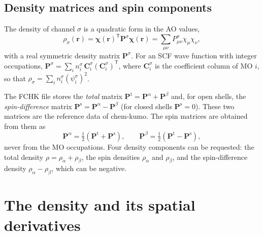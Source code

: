 \documentclass[11pt,a4paper]{article}
\begin{document}
\subsection{Density matrices and spin components}
The density of channel $\sigma$ is a quadratic form in the AO values,
\begin{equation}
 \rho_\sigma(\mathbf r)=\boldsymbol\chi(\mathbf r)^{\mathsf T}\mathbf P^\sigma
 \boldsymbol\chi(\mathbf r)=\sum_{\mu\nu}P^\sigma_{\mu\nu}\chi_\mu\chi_\nu,
\end{equation}
with a real symmetric density matrix $\mathbf P^\sigma$. For an SCF wave
function with integer occupations,
$\mathbf P^\sigma=\sum_i n_i^\sigma\,\mathbf C^\sigma_i(\mathbf C^\sigma_i)^{\mathsf T}$,
where $\mathbf C^\sigma_i$ is the coefficient column of MO $i$, so that
$\rho_\sigma=\sum_in_i^\sigma(\psi_i^\sigma)^2$.

The FCHK file stores the \emph{total} matrix
$\mathbf P^{\mathrm t}=\mathbf P^\alpha+\mathbf P^\beta$ and, for open
shells, the \emph{spin-difference} matrix
$\mathbf P^{\mathrm s}=\mathbf P^\alpha-\mathbf P^\beta$ (for closed shells
$\mathbf P^{\mathrm s}=0$). These two matrices are the reference data of
chem-kumo. The spin matrices are obtained from them as
\begin{equation}
 \mathbf P^\alpha=\tfrac12(\mathbf P^{\mathrm t}+\mathbf P^{\mathrm s}),\qquad
 \mathbf P^\beta=\tfrac12(\mathbf P^{\mathrm t}-\mathbf P^{\mathrm s}),
\end{equation}
never from the MO occupations. Four density components can be requested:
the total density $\rho=\rho_\alpha+\rho_\beta$, the spin densities
$\rho_\alpha$ and $\rho_\beta$, and the spin-difference density
$\rho_\alpha-\rho_\beta$, which can be negative.

\section{The density and its spatial derivatives}\label{sec:derivatives}
\end{document}
